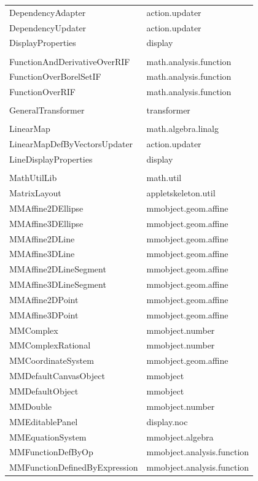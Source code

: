 \documentclass[a4paper,12pt]{book}
\begin{document}
\begin{appendix}
{\begin{longtable}{l | l}
    DependencyAdapter & action.updater\\
    DependencyUpdater & action.updater\\
    DisplayProperties & display\\
    \\
    FunctionAndDerivativeOverRIF & math.analysis.function\\
    FunctionOverBorelSetIF & math.analysis.function\\
    FunctionOverRIF & math.analysis.function\\
    \\
    GeneralTransformer & transformer\\
    \\
    LinearMap & math.algebra.linalg\\
    LinearMapDefByVectorsUpdater & action.updater\\
    LineDisplayProperties & display\\
    \\
    MathUtilLib & math.util\\
    MatrixLayout & appletskeleton.util\\
    MMAffine2DEllipse & mmobject.geom.affine\\
    MMAffine3DEllipse & mmobject.geom.affine\\
    MMAffine2DLine & mmobject.geom.affine\\
    MMAffine3DLine & mmobject.geom.affine\\
    MMAffine2DLineSegment & mmobject.geom.affine\\
    MMAffine3DLineSegment & mmobject.geom.affine\\
    MMAffine2DPoint & mmobject.geom.affine\\
    MMAffine3DPoint & mmobject.geom.affine\\
    MMComplex & mmobject.number\\
    MMComplexRational & mmobject.number\\
    MMCoordinateSystem & mmobject.geom.affine\\
    MMDefaultCanvasObject & mmobject\\
    MMDefaultObject & mmobject\\
    MMDouble & mmobject.number\\
    MMEditablePanel & display.noc\\
    MMEquationSystem & mmobject.algebra\\
    MMFunctionDefByOp & mmobject.analysis.function\\
    MMFunctionDefinedByExpression & mmobject.analysis.function\\

\end{longtable}}
\end{appendix}
\end{document}
